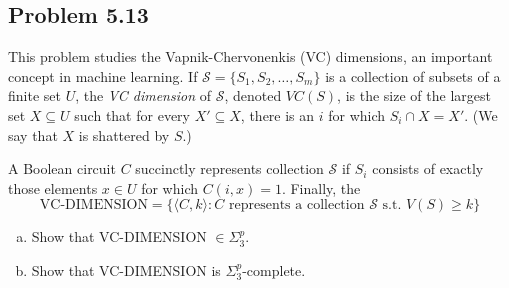 \documentclass[a4paper]{article}
\begin{document}
\subsection*{Problem 5.13}

This problem studies the Vapnik-Chervonenkis (VC) dimensions, an important concept in machine
learning. If $\mathcal{S} = \{S_1, S_2, \ldots, S_m\}$ is a collection of subsets of a finite set
$U$, the \textit{VC dimension} of $\mathcal{S}$, denoted $VC(S)$, is the size of the largest set $X
\subseteq U$ such that for every $X' \subseteq X$, there is an $i$ for which $S_i \cap X = X'$. (We
say that $X$ is shattered by $S$.)

A Boolean circuit $C$ succinctly represents collection $\mathcal{S}$ if $S_i$ consists of exactly
those elements $x \in U$ for which $C(i, x) = 1$. Finally, the
\[
  \text{VC-DIMENSION} = \{\langle C, k \rangle : C \text{ represents a collection } \mathcal{S} \text{ s.t. } V(S) \geq k\}
\]
\begin{enumerate}[(a)]
  \item Show that VC-DIMENSION $\in \Sigma_3^p$.
  \item Show that VC-DIMENSION is $\Sigma_3^p$-complete.
\end{enumerate}
\end{document}
